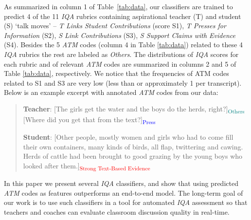 \documentclass[runningheads]{llncs}
\begin{document}
As summarized in column 1 of Table~\ref{tab:data}, %
our classifiers are trained  to predict 4 of the 11 \textit{IQA} rubrics containing aspirational teacher (T) and student (S) ‘talk moves’ – {\it T Links Student Contributions} (score S1), {\it T Presses for Information} (S2),  {\it S Link Contributions} (S3), {\it S Support Claims with Evidence} (S4). %
Besides the 5 \textit{ATM} codes (column 4 in Table \ref{tab:data}) related to these 4 \textit{IQA}  rubrics %
the rest are labeled as \textit{Others}. The distributions of \textit{IQA}  scores for each rubric and of relevant \textit{ATM} codes are summarized in columns 2 and 5 of Table \ref{tab:data}, respectively. We notice that the frequencies of ATM codes related to S1 and S3 are very low (less than or approximately 1 per transcript).
Below is an example excerpt with annotated \textit{ATM} codes from our data:

\begin{quote}
    \textbf{Teacher}: [The girls get the water and the boys do the herds, right?]\textsubscript{\textcolor{teal}{Others}}
    [Where did you get that from the text?]\textsubscript{\textcolor{blue}{Press}}
     
     \textbf{Student}: [Other people, mostly women and girls who had to come fill their own containers, many kinds of birds, all flap, twittering and cawing. Herds of cattle had been brought to good grazing by the young boys who looked after them.]\textsubscript{\textcolor{red}{Strong Text-Based Evidence}}
\end{quote}

In this paper we present several  {\it IQA} classifiers, and show that using predicted {\it ATM} codes as features outperforms an end-to-end model. The long-term goal of our work is to use such classifiers in  a tool for automated {\it IQA} assessment  so that teachers and coaches can evaluate classroom discussion quality in real-time.
\end{document}
